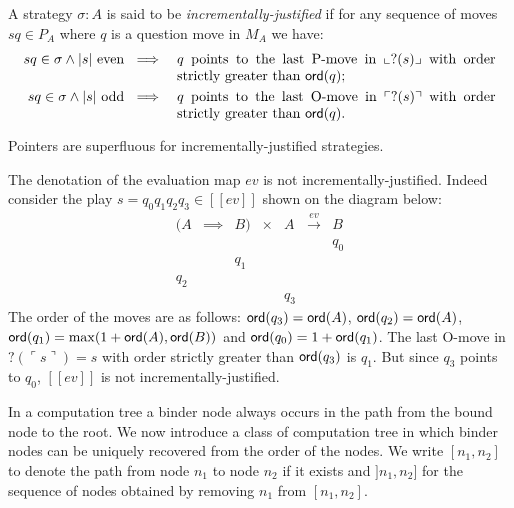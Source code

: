 \documentclass{llncs}
\newcommand\ord[1]{{\sf ord}(#1)}
\newcommand{\lsem}{[\![} %
\newcommand{\rsem}{]\!]} %
\newcommand{\sem}[1]{{\lsem #1 \rsem}}
\newcommand{\oview}[1]{\llcorner #1 \lrcorner}
\newcommand{\pview}[1]{\ulcorner #1 \urcorner}
\begin{document}
\begin{definition}
A strategy $\sigma : A$ is said to be \emph{incrementally-justified}
if for any sequence of moves $s q \in P_A$ where $q$ is a question
move in $M_A$ we have:
\begin{eqnarray*}
s q \in \sigma \wedge |s| \mbox{ even } &\implies& \parbox[t]{8cm}{$q$ points to the last P-move in $\oview{?(s)}$ with order strictly greater than $\ord{q}$;} \\
s q \in \sigma \wedge |s| \mbox{ odd } &\implies&
\parbox[t]{8cm}{$q$  points to the last O-move in $\pview{?(s)}$
with order strictly greater than $\ord{q}$.}
\end{eqnarray*}
\end{definition}

\begin{lemma}
\label{lem:incrjustified_pointers_uniqu_recover} Pointers are
superfluous for incrementally-justified strategies.
\end{lemma}

\begin{example}
The denotation of the evaluation map $ev$ is not
incrementally-justified. Indeed consider the play $s = q_0 q_1 q_2
q_3 \in \sem{ev}$ shown on the diagram below:
$$\begin{array}{cccccccc}
(A & \implies & B) & \times  & A & \stackrel{ev}{\longrightarrow} & B \\
&&&&&& q_0 \\
&& q_1 \\
 q_2 \\
 &&&&q_3
\end{array}$$
The order of the moves are as follows:  $\ord{q_3} = \ord{A}$,
$\ord{q_2} = \ord{A}$, $\ord{q_1} = \max( 1+\ord{A}, \ord{B})$ and
$\ord{q_0} = 1 + \ord{q_1}$. The last O-move in $?(\pview{s})= s$
with order strictly greater than $\ord{q_3}$ is $q_1$.
 But since $q_3$ points to $q_0$, $\sem{ev}$ is not incrementally-justified.
\end{example}


In a computation tree a binder node always occurs in the path from
the bound node to the root. We now introduce a class of computation
tree in which binder nodes can be uniquely recovered from the order
of the nodes. We write $[n_1,n_2]$ to denote the path from node
$n_1$ to node $n_2$ if it exists and $]n_1,n_2]$ for the sequence of
nodes obtained by removing $n_1$ from $[n_1,n_2]$.
\end{document}
